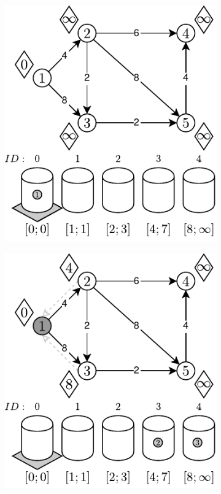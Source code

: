 \begin{figure}[!htbp]
	\centering
	\begin{subfigure}[b]{0.3\textwidth}
		\includegraphics[width=\textwidth]{Chapter_II/RADIX-HEAP-C-Example/a.pdf}
		\caption{}
	\end{subfigure}
	\begin{subfigure}[b]{0.3\textwidth}
		\includegraphics[width=\textwidth]{Chapter_II/RADIX-HEAP-C-Example/b.pdf}

\end{subfigure}
\end{figure}

